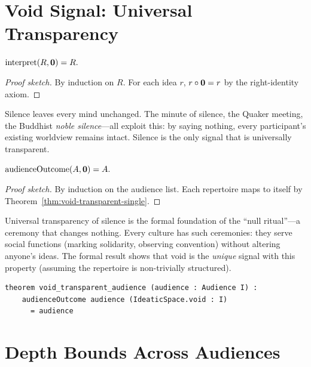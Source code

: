 \section{Void Signal: Universal Transparency}
\label{sec:mr-void}

\begin{theorem}
\label{thm:void-transparent-single}
$\mathrm{interpret}(R, \mathbf{0}) = R.$
\end{theorem}

\begin{proof}[Proof sketch]
By induction on $R$.  For each idea $r$, $r\circ\mathbf{0} = r$ by the
right-identity axiom.
\end{proof}

Silence leaves every mind unchanged.  The minute of silence, the Quaker
meeting, the Buddhist \emph{noble silence}---all exploit this: by saying
nothing, every participant's existing worldview remains intact.  Silence
is the only signal that is universally transparent.

\begin{theorem}
\label{thm:void-transparent-audience}
$\mathrm{audienceOutcome}(A, \mathbf{0}) = A.$
\end{theorem}

\begin{proof}[Proof sketch]
By induction on the audience list.  Each repertoire maps to itself
by Theorem~\ref{thm:void-transparent-single}.
\end{proof}

Universal transparency of silence is the formal foundation of the ``null
ritual''---a ceremony that changes nothing.  Every culture has such
ceremonies: they serve social functions (marking solidarity, observing
convention) without altering anyone's ideas.  The formal result shows that
void is the \emph{unique} signal with this property (assuming the repertoire
is non-trivially structured).

\begin{lstlisting}[caption={Void transparency for audiences in Lean~4.}]
theorem void_transparent_audience (audience : Audience I) :
    audienceOutcome audience (IdeaticSpace.void : I)
      = audience
\end{lstlisting}


\section{Depth Bounds Across Audiences}
\label{sec:mr-depth}

